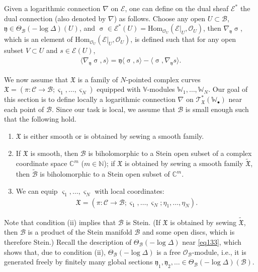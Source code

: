 \documentclass[12pt,b5paper,notitlepage]{report}
\theoremstyle{definition}
\theoremstyle{plain}
\newcommand{\fk}{\mathfrak}
\newcommand{\mc}{\mathcal}
\newcommand{\wtd}{\widetilde}
\newcommand{\Hom}{\mathrm{Hom}}
\newcommand{\bk}[1]{\langle {#1}\rangle}
\newcommand{\scr}{\mathscr}
\newcommand{\yk}{\mathfrak y}
\newcommand{\sgm}{\varsigma}
\newcommand{\blt}{\bullet}
\newcommand{\Vbb}{\mathbb V}
\newcommand{\Wbb}{\mathbb W}
\newcommand{\Cbb}{\mathbb C}
\newcommand{\Nbb}{\mathbb N}
\numberwithin{equation}{section}
\begin{document}
Given a logarithmic connection $\nabla$ on $\scr E$, one can define  on the dual sheaf $\scr E^*$ the dual connection (also denoted by $\nabla$) as follows. Choose any open $U\subset\mc B$, $\yk\in\Theta_{\mc B}(-\log\Delta)(U)$, and  $\upsigma\in\scr E^*(U)=\Hom_{\scr O_U}(\scr E|_U,\scr O_U)$, then $\nabla_{\yk}\upsigma$, which is an element of $\Hom_{\scr O_U}(\scr E|_U,\scr O_U)$, is defined such that for any open subset $V\subset U$ and $s\in\scr E(U)$,
\begin{align}
\bk{\nabla_{\yk}\upsigma,s}=\yk\bk{\upsigma,s}-\bk{\upsigma,\nabla_{\yk}s}.
\end{align}

We now assume that $\fk X$ is a family of $N$-pointed complex curves $\fk X=(\pi:\mc C\rightarrow\mc B;\sgm_1,\dots,\sgm_N)$ equipped with $\Vbb$-modules $\Wbb_1,\dots,\Wbb_N$. Our goal of this section is to define locally a logarithmic connection $\nabla$ on $\scr T_{\fk X}^*(\Wbb_\blt)$ near each point of $\mc B$. Since our task is local, we assume that $\mc B$ is small enough such that the following hold. 
\begin{enumerate}[label=(\roman*)]
\item $\fk X$ is either smooth or is obtained by sewing a smooth family.
\item If $\fk X$ is smooth,  then $\mc B$ is biholomorphic to a  Stein open subset of a complex coordinate space $\Cbb^m$  ($m\in\Nbb$); if $\fk X$ is obtained by sewing a smooth family $\wtd{\fk X}$, then  $\wtd{\mc B}$ is biholomorphic to a  Stein open subset of $\Cbb^m$.
\item We can equip $\sgm_1,\dots,\sgm_N$ with local coordinates:
\begin{align*}
\fk X=(\pi:\mc C\rightarrow\mc B;\sgm_1,\dots,\sgm_N;\eta_1,\dots,\eta_N).
\end{align*}
\end{enumerate}
Note that condition (ii) implies that $\mc B$ is Stein. (If $\fk X$ is obtained by sewing $\wtd{\fk X}$, then $\mc B$ is a product of the Stein manifold $\mc B$ and some open discs, which is therefore Stein.) Recall  the description of $\Theta_{\mc B}(-\log\Delta)$ near \eqref{eq133}, which shows that, due to condition (ii), $\Theta_{\mc B}(-\log\Delta)$ is a free $\scr O_{\mc B}$-module, i.e., it is generated freely by finitely many global sections $\fk y_1,\fk y_2,\dots\in \Theta_{\mc B}(-\log\Delta)(\mc B)$.
\end{document}
